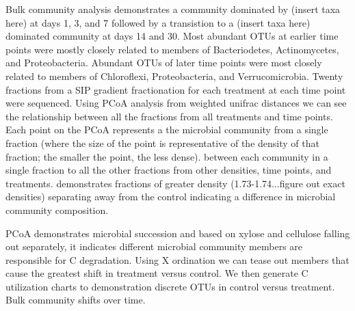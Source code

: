 Bulk community analysis demonstrates a community dominated by (insert taxa here) at days 1, 3, and 7 followed by a transistion to a (insert taxa here) dominated community at days 14 and 30. Most abundant OTUs at earlier time points were mostly closely related to members of Bacteriodetes, Actinomycetes, and Proteobacteria.  Abundant OTUs of later time points were most closely related to members of Chloroflexi, Proteobacteria, and Verrucomicrobia.  Twenty fractions from a SIP gradient fractionation for each treatment at each time point were sequenced.  Using PCoA analysis from weighted unifrac distances we can see the relationship between all the fractions from all treatments and time points.  Each point on the PCoA represents a the microbial community from a single fraction (where the size of the point is representative of the density of that fraction; the smaller the point, the less dense).   
between each community in a single fraction to all the other fractions from other densities, time points, and treatments.  
demonstrates fractions of greater density (1.73-1.74...figure out exact densities) separating away from the control indicating a difference in microbial community composition.          

PCoA demonstrates microbial succession and based on xylose and cellulose falling out separately, it indicates different microbial community members are responsible for C degradation.  Using X ordination we can tease out members that cause the greatest shift in treatment versus control.  We then generate C utilization charts to demonstration discrete OTUs in control versus treatment.  Bulk community shifts over time.  